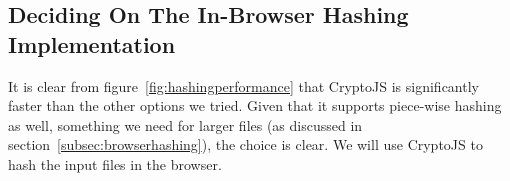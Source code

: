 \subsection{Deciding On The In-Browser Hashing Implementation}
\label{subsec:deciding-on-the-in-browser-hashing-implementation}
It is clear from figure~\ref{fig:hashingperformance} that CryptoJS is significantly faster than the other options we tried.
Given that it supports piece-wise hashing as well,
something we need for larger files (as discussed in section~\ref{subsec:browserhashing}), the choice is clear.
We will use CryptoJS to hash the input files in the browser.













